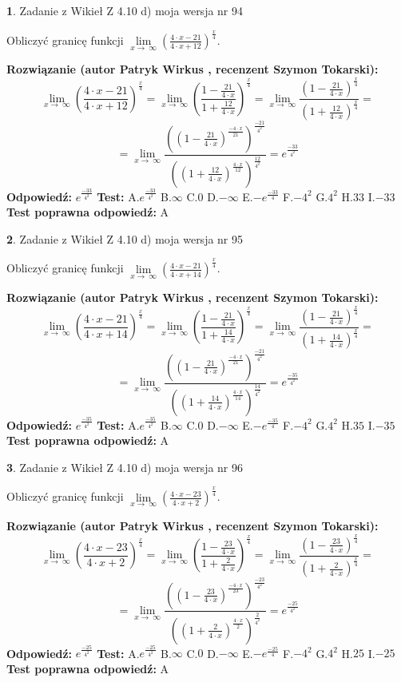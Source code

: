 \documentclass[12pt, a4paper]{article}
\theoremstyle{definition} %
\newtheorem{zad}{}
\newcommand{\zadStart}[1]{\begin{zad}#1\newline}
\newcommand{\zadStop}{\end{zad}}
\newcommand{\rozwStart}[2]{\noindent \textbf{Rozwiązanie (autor #1 , recenzent #2): }\newline}
\newcommand{\rozwStop}{\newline}
\newcommand{\odpStart}{\noindent \textbf{Odpowiedź:}\newline}
\newcommand{\odpStop}{\newline}
\newcommand{\testStart}{\noindent \textbf{Test:}\newline}
\newcommand{\testStop}{\newline}
\newcommand{\kluczStart}{\noindent \textbf{Test poprawna odpowiedź:}\newline}
\newcommand{\kluczStop}{\newline}
\begin{document}
\zadStart{Zadanie z Wikieł Z 4.10 d) moja wersja nr 94}


Obliczyć granicę funkcji  $\lim\limits_{x\to\ \infty}(\frac{4\cdot x-21}{4\cdot x+12})^{\frac{x}{4}}$.
\zadStop
\rozwStart{Patryk Wirkus}{Szymon Tokarski}
$$\lim\limits_{x\to\ \infty}(\frac{4\cdot x-21}{4\cdot x+12})^{\frac{x}{4}} = \lim\limits_{x\to\ \infty}(\frac{1-\frac{21}{4\cdot x}}{1+\frac{12}{4\cdot x}})^{\frac{x}{4}}=\lim\limits_{x\to\ \infty}\frac{(1-\frac{21}{4\cdot x})^{\frac{x}{4}}}{(1+\frac{12}{4\cdot x})^{\frac{x}{4}}}=$$
$$=\lim\limits_{x\to\ \infty}\frac{((1-\frac{21}{4\cdot x})^{\frac{-4\cdot x}{21}})^{\frac{-21}{4^{2}}}}{((1+\frac{12}{4\cdot x})^{\frac{4\cdot x}{12}})^{\frac{12}{4^{2}}}}=e^{\frac{-33}{4^{2}}}$$
\rozwStop
\odpStart
$e^{\frac{-33}{4^{2}}}$
\odpStop
\testStart
A.$e^{\frac{-33}{4^{2}}}$ B.$\infty$ C.$0$ D.$-\infty$ E.$-e^{\frac{-33}{4}}$
F.$-4^{2}$ G.$4^{2}$
H.$33$
I.$-33$
\testStop
\kluczStart
A
\kluczStop



\zadStart{Zadanie z Wikieł Z 4.10 d) moja wersja nr 95}


Obliczyć granicę funkcji  $\lim\limits_{x\to\ \infty}(\frac{4\cdot x-21}{4\cdot x+14})^{\frac{x}{4}}$.
\zadStop
\rozwStart{Patryk Wirkus}{Szymon Tokarski}
$$\lim\limits_{x\to\ \infty}(\frac{4\cdot x-21}{4\cdot x+14})^{\frac{x}{4}} = \lim\limits_{x\to\ \infty}(\frac{1-\frac{21}{4\cdot x}}{1+\frac{14}{4\cdot x}})^{\frac{x}{4}}=\lim\limits_{x\to\ \infty}\frac{(1-\frac{21}{4\cdot x})^{\frac{x}{4}}}{(1+\frac{14}{4\cdot x})^{\frac{x}{4}}}=$$
$$=\lim\limits_{x\to\ \infty}\frac{((1-\frac{21}{4\cdot x})^{\frac{-4\cdot x}{21}})^{\frac{-21}{4^{2}}}}{((1+\frac{14}{4\cdot x})^{\frac{4\cdot x}{14}})^{\frac{14}{4^{2}}}}=e^{\frac{-35}{4^{2}}}$$
\rozwStop
\odpStart
$e^{\frac{-35}{4^{2}}}$
\odpStop
\testStart
A.$e^{\frac{-35}{4^{2}}}$ B.$\infty$ C.$0$ D.$-\infty$ E.$-e^{\frac{-35}{4}}$
F.$-4^{2}$ G.$4^{2}$
H.$35$
I.$-35$
\testStop
\kluczStart
A
\kluczStop



\zadStart{Zadanie z Wikieł Z 4.10 d) moja wersja nr 96}


Obliczyć granicę funkcji  $\lim\limits_{x\to\ \infty}(\frac{4\cdot x-23}{4\cdot x+2})^{\frac{x}{4}}$.
\zadStop
\rozwStart{Patryk Wirkus}{Szymon Tokarski}
$$\lim\limits_{x\to\ \infty}(\frac{4\cdot x-23}{4\cdot x+2})^{\frac{x}{4}} = \lim\limits_{x\to\ \infty}(\frac{1-\frac{23}{4\cdot x}}{1+\frac{2}{4\cdot x}})^{\frac{x}{4}}=\lim\limits_{x\to\ \infty}\frac{(1-\frac{23}{4\cdot x})^{\frac{x}{4}}}{(1+\frac{2}{4\cdot x})^{\frac{x}{4}}}=$$
$$=\lim\limits_{x\to\ \infty}\frac{((1-\frac{23}{4\cdot x})^{\frac{-4\cdot x}{23}})^{\frac{-23}{4^{2}}}}{((1+\frac{2}{4\cdot x})^{\frac{4\cdot x}{2}})^{\frac{2}{4^{2}}}}=e^{\frac{-25}{4^{2}}}$$
\rozwStop
\odpStart
$e^{\frac{-25}{4^{2}}}$
\odpStop
\testStart
A.$e^{\frac{-25}{4^{2}}}$ B.$\infty$ C.$0$ D.$-\infty$ E.$-e^{\frac{-25}{4}}$
F.$-4^{2}$ G.$4^{2}$
H.$25$
I.$-25$
\testStop
\kluczStart
A
\kluczStop
\end{document}

